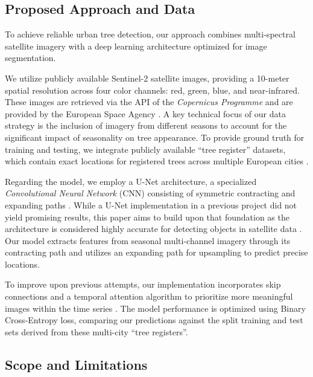 \subsection{Proposed Approach and Data}

To achieve reliable urban tree detection, our approach combines multi-spectral satellite imagery with a deep learning architecture optimized for image segmentation.

We utilize publicly available Sentinel-2 satellite images, providing a 10-meter spatial resolution across four color channels: red, green, blue, and near-infrared. These images are retrieved via the API of the \textit{Copernicus Programme} and are provided by the European Space Agency \cite{copernicus2025}. A key technical focus of our data strategy is the inclusion of imagery from different seasons to account for the significant impact of seasonality on tree appearance. To provide ground truth for training and testing, we integrate publicly available ``tree register'' datasets, which contain exact locations for registered trees across multiple European cities \cite{baumkataster2025, linzcadastre, innsbruckcadastre, parisarbres, barcelonaarbrat, hamburgbaumkataster}.

Regarding the model, we employ a U-Net architecture, a specialized \textit{Convolutional Neural Network} (CNN) consisting of symmetric contracting and expanding paths \cite{aramendia2024}. While a U-Net implementation in a previous project did not yield promising results, this paper aims to build upon that foundation as the architecture is considered highly accurate for detecting objects in satellite data \cite{pesek2024convolution, garnot2021panoptic}. Our model extracts features from seasonal multi-channel imagery through its contracting path and utilizes an expanding path for upsampling to predict precise locations.

To improve upon previous attempts, our implementation incorporates skip connections and a temporal attention algorithm to prioritize more meaningful images within the time series \cite{garnot2021panoptic}. The model performance is optimized using Binary Cross-Entropy loss, comparing our predictions against the split training and test sets derived from these multi-city ``tree registers''.

\subsection{Scope and Limitations}

